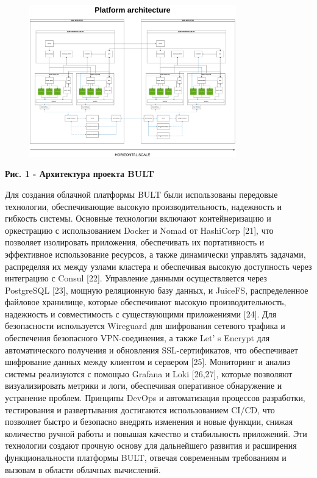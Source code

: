{\begin{figure}[H]
	\centering
	\includegraphics[width=0.8\textwidth]{media/ict/image18}
	\caption*{}
\end{figure}


{\bfseries Рис. 1 - Архитектура проекта BULT}

Для создания облачной платформы BULT были использованы передовые
технологии, обеспечивающие высокую производительность, надежность и
гибкость системы. Основные технологии включают контейнеризацию и
оркестрацию с использованием Docker и Nomad от HashiCorp {[}21{]}, что
позволяет изолировать приложения, обеспечивать их портативность и
эффективное использование ресурсов, а также динамически управлять
задачами, распределяя их между узлами кластера и обеспечивая высокую
доступность через интеграцию с Consul {[}22{]}. Управление данными
осуществляется через PostgreSQL {[}23{]}, мощную реляционную базу
данных, и JuiceFS, распределенное файловое хранилище, которые
обеспечивают высокую производительность, надежность и совместимость с
существующими приложениями {[}24{]}. Для безопасности используется
Wireguard для шифрования сетевого трафика и обеспечения безопасного
VPN-соединения, а также Let' s Encrypt для
автоматического получения и обновления SSL-сертификатов, что
обеспечивает шифрование данных между клиентом и сервером {[}25{]}.
Мониторинг и анализ системы реализуются с помощью Grafana и Loki
{[}26,27{]}, которые позволяют визуализировать метрики и логи,
обеспечивая оперативное обнаружение и устранение проблем. Принципы
DevOps и автоматизация процессов разработки, тестирования и
развертывания достигаются использованием CI/CD, что позволяет быстро и
безопасно внедрять изменения и новые функции, снижая количество ручной
работы и повышая качество и стабильность приложений. Эти технологии
создают прочную основу для дальнейшего развития и расширения
функциональности платформы BULT, отвечая современным требованиям и
вызовам в области облачных вычислений.

}
